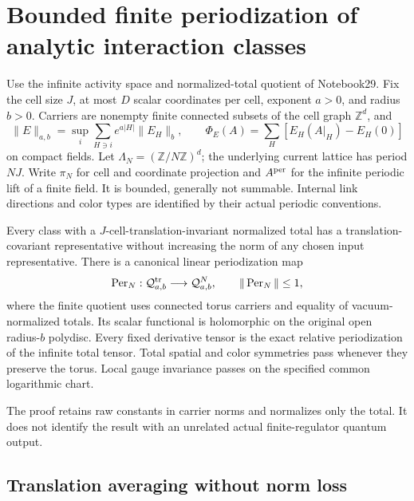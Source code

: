 \section{Bounded finite periodization of analytic interaction classes}
\label{pid-section}

Use the infinite activity space and normalized-total quotient of
Notebook29. Fix the cell size $J$, at most $D$ scalar coordinates
per cell, exponent $a>0$, and radius $b>0$. Carriers are nonempty
finite connected subsets of the cell graph $\mathbb Z^d$, and
\begin{equation}
 \|E\|_{a,b}=\sup_i\sum_{H\ni i}e^{a|H|}\|E_H\|_b,
 \qquad
 \Phi_E(A)=\sum_H[E_H(A|_H)-E_H(0)]
 \label{pid-space}
\end{equation}
on compact fields. Let $\Lambda_N=(\mathbb Z/N\mathbb Z)^d$;
the underlying current lattice has period $NJ$. Write $\pi_N$
for cell and coordinate projection and $A^{\rm per}$ for the
infinite periodic lift of a finite field. It is bounded, generally
not summable. Internal link directions and color types are
identified by their actual periodic conventions.

\begin{theorem}
\label{pid-theorem}
Every class with a $J$-cell-translation-invariant normalized total
has a translation-covariant representative without increasing the
norm of any chosen input representative. There is a canonical
linear periodization map
\begin{equation}
 \operatorname{Per}_N:\mathcal Q^{\rm tr}_{a,b}
                   \longrightarrow\mathcal Q^N_{a,b},
 \qquad \|\operatorname{Per}_N\|\le1,
 \label{pid-operator}
\end{equation}
where the finite quotient uses connected torus carriers and
equality of vacuum-normalized totals. Its scalar functional is
holomorphic on the original open radius-$b$ polydisc. Every
fixed derivative tensor is the exact relative periodization of
the infinite total tensor. Total spatial and color symmetries
pass whenever they preserve the torus. Local gauge invariance
passes on the specified common logarithmic chart.
\end{theorem}

The proof retains raw constants in carrier norms and normalizes
only the total. It does not identify the result with an unrelated
actual finite-regulator quantum output.

\subsection{Translation averaging without norm loss}
\label{pid-averaging-section}

